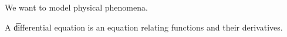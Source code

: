 

We want to model physical phenomena.


A \t{differential equation} is an equation relating functions and their derivatives.

\blankpage
